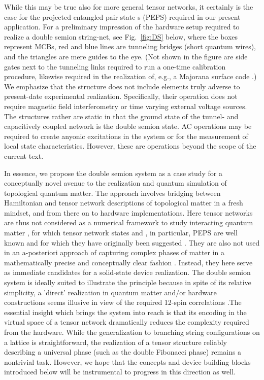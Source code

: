 \documentclass[twocolumn,floats,prx,showpacs]{revtex4-1}
\newcommand{\rein}[1]{{\color{rein} #1}}
\begin{document}
While this may be true also for more general tensor networks, it certainly is the case for the projected entangled pair state\rein{s (PEPS)} required in our present application.  For a preliminary impression of the hardware setup required to realize a double semion string-net, see Fig.~\ref{fig:DS} below, where the boxes represent MCBs, red and blue lines are tunneling bridges (short quantum wires), and the triangles are mere guides to the eye. (Not shown in the figure are side gates next to the tunneling links required to run a one-time calibration procedure, likewise required in the realization of, e.g., a Majorana surface code 
\cite{PhysRevLett.116.050501,PhysRevB.94.174514,PhysRevLett.108.260504,PhysRevX.6.031016,Hoffman16,Roy2017}.) We emphasize that the structure does not include elements truly adverse to present-date experimental realization. Specifically, their operation does not require magnetic field interferometry or time varying external voltage sources. The structures rather are static in that the ground state of the tunnel- and capacitively coupled network is the double semion state. AC operations may be required to create anyonic excitations in the system or for the measurement of local state characteristics. However, these are operations beyond the scope of the current text. 

In essence, we propose the double semion system as a case study  for a conceptually novel avenue to the realization and quantum simulation of topological quantum matter. The approach involves bridging between Hamiltonian and tensor network descriptions of topological matter
in a fresh mindset, and from there on to hardware implementations. Here tensor networks are thus not considered as a numerical 
framework to study interacting quantum matter \cite{Orus-AnnPhys-2014,AreaReview,VerstraeteBig,Orus-AnnPhys-2014}, 
for which tensor network states and\rein{, in particular, PEPS }\cite{PEPSOld, iPEPS}
are well known and for which they have originally been suggested \cite{DMRGWhite92}. They are also not used in an
a-posteriori approach of capturing complex phases of matter in a mathematically precise and conceptually clear
fashion \cite{TopologicalOrderInPEPS,PEPSTopology,ClassificationPhases,PhysRevB.81.064439,PhysRevB.95.245127,FermionicMPO,1409.2150}. 
Instead, they here serve as immediate candidates for a solid-state device realization. 
The double semion system is ideally suited to illustrate the principle because in spite of its relative simplicity, a 'direct' realization in quantum matter and/or hardware constructions seems illusive in view of the required 12-spin correlations \cite{Note1}.The essential insight which brings the system into reach is that its encoding in the virtual space of a tensor network dramatically reduces the complexity required from the hardware. While the generalization to branching string configurations on a lattice is straightforward, the realization of a tensor structure reliably describing a universal phase (such as the double Fibonacci phase) remains a nontrivial task. However, we hope that the concepts and device building blocks introduced below will be instrumental to progress in this direction as well. 
 
\end{document}
